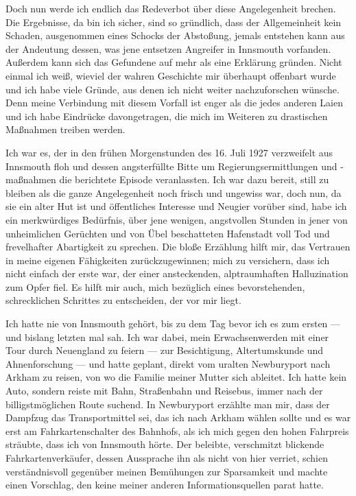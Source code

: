 Doch nun werde ich endlich das Redeverbot über diese Angelegenheit brechen. Die Ergebnisse, da bin ich sicher, sind so gründlich, dass der Allgemeinheit kein Schaden, ausgenommen eines Schocks der Abstoßung, jemals entstehen kann aus der Andeutung dessen, was jene entsetzen Angreifer in Innsmouth vorfanden. Außerdem kann sich das Gefundene auf mehr als eine Erklärung gründen. Nicht einmal ich weiß, wieviel der wahren Geschichte mir überhaupt offenbart wurde und ich habe viele Gründe, aus denen ich nicht weiter nachzuforschen wünsche. Denn meine Verbindung mit diesem Vorfall ist enger als die jedes anderen Laien und ich habe Eindrücke davongetragen, die mich im Weiteren zu drastischen Maßnahmen treiben werden.

Ich war es, der in den frühen Morgenstunden des 16. Juli 1927 verzweifelt aus Innsmouth floh und dessen angsterfüllte Bitte um Regierungsermittlungen und -maßnahmen die berichtete Episode veranlassten. Ich war dazu bereit, still zu bleiben als die ganze Angelegenheit noch frisch und ungewiss war, doch nun, da sie ein alter Hut ist und öffentliches Interesse und Neugier vorüber sind, habe ich ein merkwürdiges Bedürfnis, über jene wenigen, angstvollen Stunden in jener von unheimlichen Gerüchten und von Übel beschatteten Hafenstadt voll Tod und frevelhafter Abartigkeit zu sprechen. Die bloße Erzählung hilft mir, das Vertrauen in meine eigenen Fähigkeiten zurückzugewinnen; mich zu versichern, dass ich nicht einfach der erste war, der einer ansteckenden, alptraumhaften Halluzination zum Opfer fiel. Es hilft mir auch, mich bezüglich eines bevorstehenden, schrecklichen Schrittes zu entscheiden, der vor mir liegt.

Ich hatte nie von Innsmouth gehört, bis zu dem Tag bevor ich es zum ersten --- und bislang letzten mal sah. Ich war dabei, mein Erwachsenwerden mit einer Tour durch Neuengland zu feiern --- zur Besichtigung, Altertumskunde und Ahnenforschung --- und hatte geplant, direkt vom uralten Newburyport nach Arkham zu reisen, von wo die Familie meiner Mutter sich ableitet. Ich hatte kein Auto, sondern reiste mit Bahn, Straßenbahn und Reisebus, immer nach der billigstmöglichen Route suchend. In Newburyport erzählte man mir, dass der Dampfzug das Transportmittel sei, das ich nach Arkham wählen sollte und es war erst  am Fahrkartenschalter des Bahnhofs, als ich mich gegen den hohen Fahrpreis sträubte, dass ich von Innsmouth hörte. Der beleibte, verschmitzt blickende Fahrkartenverkäufer, dessen Aussprache ihn als nicht von hier verriet, schien verständnisvoll gegenüber meinen Bemühungen zur Sparsamkeit und machte einen Vorschlag, den keine meiner anderen Informationsquellen parat hatte.

